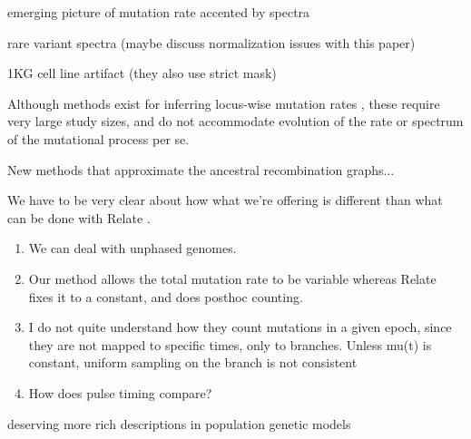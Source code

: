 \documentclass[11pt]{article}
\begin{document}
emerging picture of mutation rate accented by spectra

rare variant spectra \cite{Mathieson2017-rc} (maybe discuss normalization issues with this paper)

1KG cell line artifact \cite{Anderson-Trocme2019-fy} (they also use strict mask)

Although methods exist for inferring locus-wise mutation rates \cite{Bhaskar2015-bd, Nelson2012-fr}, these require very large study sizes, and do not accommodate evolution of the rate or spectrum of the mutational process per se.

New methods that approximate the ancestral recombination graphs...

We have to be very clear about how what we’re offering is different than what can be done with Relate \cite{Speidel2019-ox}.
\begin{enumerate}
\item We can deal with unphased genomes.
\item Our method allows the total mutation rate to be variable whereas Relate fixes it to a constant, and does posthoc counting.
\item I do not quite understand how they count mutations in a given epoch, since they are not mapped to specific times, only to branches.
Unless mu(t) is constant, uniform sampling on the branch is not consistent
\item How does pulse timing compare?
\end{enumerate}

deserving more rich descriptions in population genetic models









\end{document}
